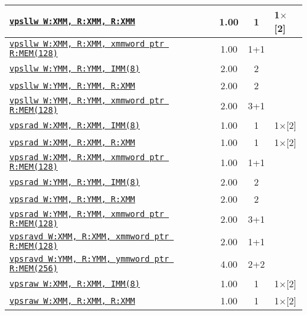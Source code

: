 \documentclass[a4paper,english,fontsize=9]{scrartcl}
\begin{document}
\begin{longtable}{p{}ccL{.25\textwidth}}
  \midrule
  \texttt{\href{https://felixcloutier.com/x86/PSLLW:PSLLD:PSLLQ.html}{vpsllw W:XMM, R:XMM, R:XMM}} & 1.00 & 1 & 1\(\times\)[2] \\
  \midrule
  \texttt{\href{https://felixcloutier.com/x86/PSLLW:PSLLD:PSLLQ.html}{vpsllw W:XMM, R:XMM, xmmword ptr R:MEM(128)}} & 1.00 & 1+1 &  \\
  \midrule
  \texttt{\href{https://felixcloutier.com/x86/PSLLW:PSLLD:PSLLQ.html}{vpsllw W:YMM, R:YMM, IMM(8)}} & 2.00 & 2 &  \\
  \midrule
  \texttt{\href{https://felixcloutier.com/x86/PSLLW:PSLLD:PSLLQ.html}{vpsllw W:YMM, R:YMM, R:XMM}} & 2.00 & 2 &  \\
  \midrule
  \texttt{\href{https://felixcloutier.com/x86/PSLLW:PSLLD:PSLLQ.html}{vpsllw W:YMM, R:YMM, xmmword ptr R:MEM(128)}} & 2.00 & 3+1 &  \\
  \midrule
  \texttt{\href{https://felixcloutier.com/x86/PSRAW:PSRAD:PSRAQ.html}{vpsrad W:XMM, R:XMM, IMM(8)}} & 1.00 & 1 & 1\(\times\)[2] \\
  \midrule
  \texttt{\href{https://felixcloutier.com/x86/PSRAW:PSRAD:PSRAQ.html}{vpsrad W:XMM, R:XMM, R:XMM}} & 1.00 & 1 & 1\(\times\)[2] \\
  \midrule
  \texttt{\href{https://felixcloutier.com/x86/PSRAW:PSRAD:PSRAQ.html}{vpsrad W:XMM, R:XMM, xmmword ptr R:MEM(128)}} & 1.00 & 1+1 &  \\
  \midrule
  \texttt{\href{https://felixcloutier.com/x86/PSRAW:PSRAD:PSRAQ.html}{vpsrad W:YMM, R:YMM, IMM(8)}} & 2.00 & 2 &  \\
  \midrule
  \texttt{\href{https://felixcloutier.com/x86/PSRAW:PSRAD:PSRAQ.html}{vpsrad W:YMM, R:YMM, R:XMM}} & 2.00 & 2 &  \\
  \midrule
  \texttt{\href{https://felixcloutier.com/x86/PSRAW:PSRAD:PSRAQ.html}{vpsrad W:YMM, R:YMM, xmmword ptr R:MEM(128)}} & 2.00 & 3+1 &  \\
  \midrule
  \texttt{\href{https://felixcloutier.com/x86/VPSRAVW:VPSRAVD:VPSRAVQ.html}{vpsravd W:XMM, R:XMM, xmmword ptr R:MEM(128)}} & 2.00 & 1+1 &  \\
  \midrule
  \texttt{\href{https://felixcloutier.com/x86/VPSRAVW:VPSRAVD:VPSRAVQ.html}{vpsravd W:YMM, R:YMM, ymmword ptr R:MEM(256)}} & 4.00 & 2+2 &  \\
  \midrule
  \texttt{\href{https://felixcloutier.com/x86/PSRAW:PSRAD:PSRAQ.html}{vpsraw W:XMM, R:XMM, IMM(8)}} & 1.00 & 1 & 1\(\times\)[2] \\
  \midrule
  \texttt{\href{https://felixcloutier.com/x86/PSRAW:PSRAD:PSRAQ.html}{vpsraw W:XMM, R:XMM, R:XMM}} & 1.00 & 1 & 1\(\times\)[2] \\

\end{longtable}
\end{document}
